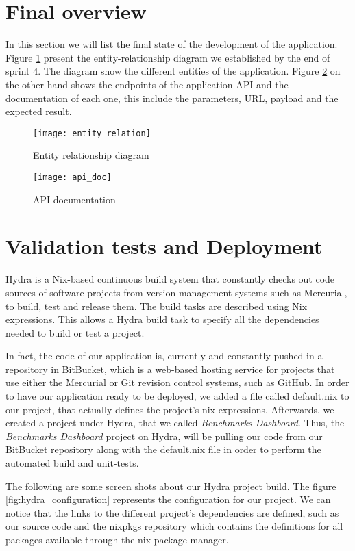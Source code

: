 \section{Final overview}
In this section we will list the final state of the development of the
application. Figure \hyperref[fig:entity_relation]{\ref{fig:entity_relation}} present the
entity-relationship diagram we established by the end of sprint 4. The diagram
show the different entities of the application. Figure
\hyperref[fig:api_doc]{\ref{fig:api_doc}} on the other hand
shows the endpoints of the application API and the documentation of each one,
this include the parameters, URL, payload and the expected result.

\begin{figure}[h]
  \centerline{\texttt{[image: entity\_relation]}}
\caption{Entity relationship diagram}
\label{fig:entity_relation}
\end{figure}

\begin{figure}[h]
  \centerline{\texttt{[image: api\_doc]}}
\caption{API documentation}
\label{fig:api_doc}
\end{figure}


\section{Validation tests and Deployment}
Hydra is a Nix-based continuous build system that constantly checks out code
sources of software projects from version management systems such as Mercurial,
to build, test and release them. The build tasks are described using Nix
expressions. This allows a Hydra build task to specify all the dependencies
needed to build or test a project.

In fact, the code of our application is, currently and constantly pushed in a
repository in BitBucket, which is a web-based hosting service for projects that
use either the Mercurial or Git revision control systems, such as GitHub. In
order to have our application ready to be deployed, we added a file called
default.nix to our project, that actually defines the project's nix-expressions.
Afterwards, we created a project under Hydra, that we called \emph{Benchmarks
  Dashboard}. Thus, the \emph{Benchmarks Dashboard} project on Hydra, will be
pulling our code from our BitBucket repository along with the default.nix file
in order to perform the automated build and unit-tests.

The following are some screen shots about our Hydra project build. The figure
\hyperref[fig:hydra_configuration]{\ref{fig:hydra_configuration}}
represents the configuration for our project. We can notice that the links to the
different project's dependencies are defined, such as our source code and the
nixpkgs repository which contains the definitions for all packages available through
the nix package manager.

